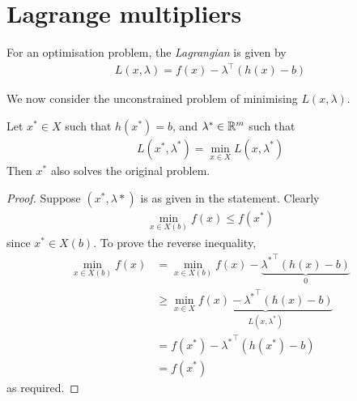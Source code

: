\documentclass{../../template/note}
\begin{document}
    \section{Lagrange multipliers}

    \begin{definition}[Lagragian]
        For an optimisation problem, the \emph{Lagrangian} is given by
        \begin{align*}
            L(x, \lambda) = f(x) - \lambda^\intercal (h(x)-b)
        \end{align*}
    \end{definition}
    
    We now consider the unconstrained problem of minimising $L(x, \lambda)$.

    \begin{theorem}
        Let $x^* \in X$ such that $h(x^*)=b$, and $\lambda^* \in \mathbb R^m$ such that
        \begin{align*}
            L(x^*, \lambda^*) = \min_{x \in X} L(x, \lambda^*)
        \end{align*}
        Then $x^*$ also solves the original problem.        
    \end{theorem}
    
    \begin{proof}
        Suppose $(x^*, \lambda*)$ is as given in the statement. Clearly
        \begin{align*}
            \min_{x \in X(b)} f(x) \leq f(x^*)
        \end{align*}
        since $x^* \in X(b)$. To prove the reverse inequality,
        \begin{align*}
            \min_{x \in X(b)} f(x) &= \min_{x \in X(b)} f(x) - \underbrace{{\lambda^*}^\intercal (h(x)-b)}_0 \\
            &\geq \min_{x \in X} \underbrace{f(x) - {\lambda^*}^\intercal (h(x)-b)}_{L(x, \lambda^*)} \\
            &= f(x^*) - {\lambda^*}^\intercal (h(x^*)-b) \\
            &= f(x^*)
        \end{align*}
        as required.
    \end{proof}
    
\end{document}
